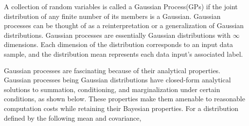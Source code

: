 \documentclass[letterpaper,11pt]{extarticle}
\begin{document}
A collection of random variables is called a Gaussian Process(GPs) if the joint distribution of any finite number of its members is a Gaussian. Gaussian processes can be thought of as a reinterpretation or a generalization of Gaussian distributions. Gaussian processes are essentially Gaussian distributions with  $\infty$ dimensions. Each dimension of the distribution corresponds to an input data sample, and the distribution mean represents each data input's associated label. 

Gaussian processes are fascinating because of their analytical properties. Gaussian processes being Gaussian distributions have closed-form analytical solutions to summation, conditioning, and marginalization under certain conditions, as shown below. These properties make them amenable to reasonable computation costs while retaining their Bayesian properties. For a distribution defined by the following mean and covariance, 
\end{document}
